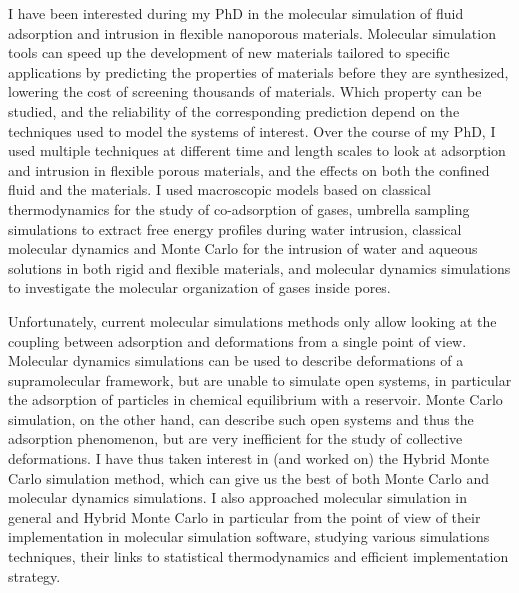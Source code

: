 \newpage
I have been interested during my PhD in the molecular simulation of fluid
adsorption and intrusion in flexible nanoporous materials. Molecular simulation
tools can speed up the development of new materials tailored to specific
applications by predicting the properties of materials before they are
synthesized, lowering the cost of screening thousands of materials. Which
property can be studied, and the reliability of the corresponding prediction
depend on the techniques used to model the systems of interest. Over the course
of my PhD, I used multiple techniques at different time and length scales to
look at adsorption and intrusion in flexible porous materials, and the effects
on both the confined fluid and the materials. I used macroscopic models based on
classical thermodynamics for the study of co-adsorption of gases, umbrella
sampling simulations to extract free energy profiles during water intrusion,
classical molecular dynamics and Monte Carlo for the intrusion of water and
aqueous solutions in both rigid and flexible materials, and \abinitio molecular
dynamics simulations to investigate the molecular organization of gases inside
pores.

Unfortunately, current molecular simulations methods only allow looking at the
coupling between adsorption and deformations from a single point of view.
Molecular dynamics simulations can be used to describe deformations of a
supramolecular framework, but are unable to simulate open systems, in particular
the adsorption of particles in chemical equilibrium with a reservoir. Monte
Carlo simulation, on the other hand, can describe such open systems and thus the
adsorption phenomenon, but are very inefficient for the study of collective
deformations. I have thus taken interest in (and worked on) the Hybrid Monte
Carlo simulation method, which can give us the best of both Monte Carlo and
molecular dynamics simulations. I also approached molecular simulation in
general and Hybrid Monte Carlo in particular from the point of view of their
implementation in molecular simulation software, studying various simulations
techniques, their links to statistical thermodynamics and efficient
implementation strategy.

\begin{center}
\end{center}

